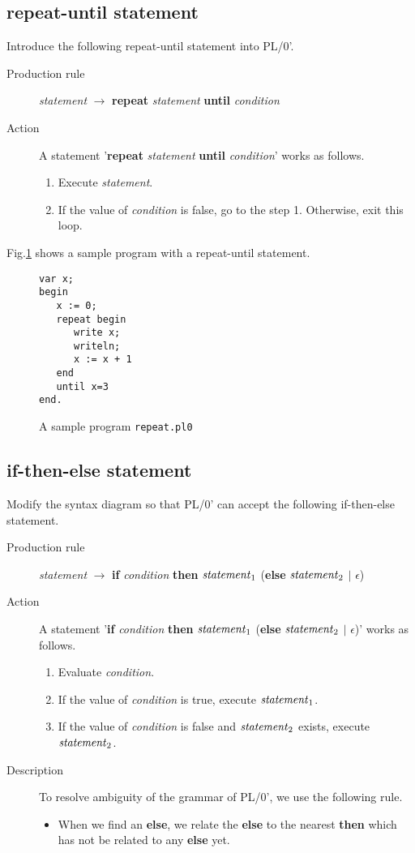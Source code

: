 \documentclass{article}
\begin{document}
\subsection*{repeat-until statement}
Introduce the following repeat-until statement into PL/0'.
\begin{description}
 \item[Production rule] {\it statement}  $\to$ {\bf repeat} {\it statement} {\bf until} {\it condition}
 \item[Action] A statement '{\bf repeat} {\it statement} {\bf until} {\it condition}' works as follows.
	    \begin{enumerate}
	     \item Execute {\it statement}.
	     \item If the value of {\it condition} is false, go to the step 1. Otherwise, exit this loop.
	    \end{enumerate}
\end{description}

Fig.\ref{fig:repeat-until} shows a sample program with a repeat-until statement.
\begin{figure}[h]
\begin{verbatim}
var x;
begin
   x := 0;
   repeat begin
      write x; 
      writeln;
      x := x + 1
   end
   until x=3
end.
\end{verbatim}
\caption{A sample program {\tt repeat.pl0}}\label{fig:repeat-until}
\end{figure}

\subsection*{if-then-else statement}
Modify the syntax diagram so that PL/0' can accept the following if-then-else statement.
\begin{description}
 \item[Production rule] {\it statement}  $\to$ {\bf if} {\it condition} {\bf then} 
       ${\it statement}_1$ ({\bf else} ${\it statement}_2$ $\vert$ {$\epsilon$})
 \item[Action] A statement '{\bf if} {\it condition} {\bf then} 
	    ${\it statement}_1$ ({\bf else} ${\it statement}_2$ $\vert$ {$\epsilon$})'
	    works as follows.
	    \begin{enumerate}
	     \item Evaluate {\it condition}.
	     \item If the value of {\it condition} is true, execute ${\it statement}_1$.
	     \item If the value of {\it condition} is false and ${\it statement}_2$ exists, 
		   execute ${\it statement}_2$.
	    \end{enumerate}
 \item[Description] To resolve ambiguity of the grammar of PL/0', 
	    we use the following rule.
	    \begin{itemize}
	     \item When we find an {\bf else}, we relate the {\bf else} to the nearest {\bf then}
		   which has not be related to any {\bf else} yet.
	    \end{itemize}
\end{description}
\end{document}
